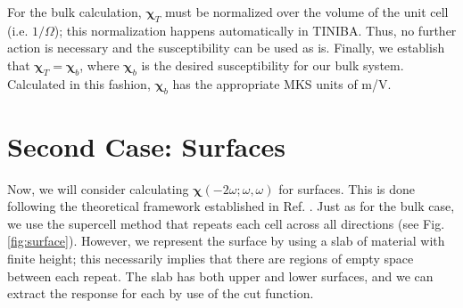 \documentclass[letterpaper,10pt]{article}
\begin{document}
For the bulk calculation, $\boldsymbol{\chi}_{T}$ must be normalized over the
volume of the unit cell (i.e. $1/\Omega$); this normalization happens
automatically in TINIBA. Thus, no further action is necessary and the
susceptibility can be used as is. Finally, we establish that
$\boldsymbol{\chi}_{T} = \boldsymbol{\chi}_{b}$, where $\boldsymbol{\chi}_{b}$
is the desired susceptibility for our bulk system. Calculated in this fashion,
$\boldsymbol{\chi}_{b}$ has the appropriate MKS units of m/V.



\section*{Second Case: Surfaces}

Now, we will consider calculating $\boldsymbol{\chi}(-2\omega;\omega,\omega)$
for surfaces. This is done following the theoretical framework established in
Ref. \cite{andersonPRB15}. Just as for the bulk case, we use the supercell
method that repeats each cell across all directions (see Fig.
\ref{fig:surface}). However, we represent the surface by using a slab of
material with finite height; this necessarily implies that there are regions of
empty space between each repeat. The slab has both upper and lower surfaces, and
we can extract the response for each by use of the cut function.
\end{document}
